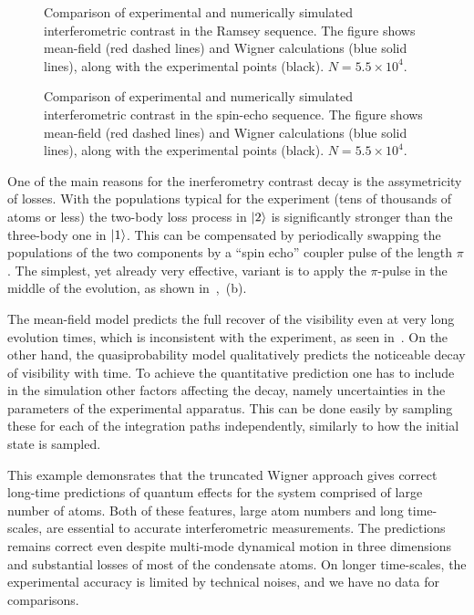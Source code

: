 \begin{figure}

    \caption{
    Comparison of experimental and numerically simulated interferometric contrast in the Ramsey sequence.
    The figure shows mean-field (red dashed lines) and Wigner calculations (blue solid lines), along with the experimental points (black).
    $N = 5.5 \times 10^4$.}

    \label{fig:bec-noise:phase-noise:ramsey-visibility}
\end{figure}

\begin{figure}

    \caption{
    Comparison of experimental and numerically simulated interferometric contrast in the spin-echo sequence.
    The figure shows mean-field (red dashed lines) and Wigner calculations (blue solid lines), along with the experimental points (black).
    $N = 5.5 \times 10^4$.}

    \label{fig:bec-noise:phase-noise:spin-echo-visibility}
\end{figure}

One of the main reasons for the inerferometry contrast decay is the assymetricity of losses.
With the populations typical for the experiment (tens of thousands of atoms or less) the two-body loss process in $\mbox{\ensuremath{\vert 2 \rangle}}$ is significantly stronger than the three-body one in $\mbox{\ensuremath{\vert 1 \rangle}}$.
This can be compensated by periodically swapping the populations of the two components by a ``spin echo'' coupler pulse of the length $\pi$.
The simplest, yet already very effective, variant is to apply the $\pi$-pulse in the middle of the evolution, as shown in~,~(b).

The mean-field model predicts the full recover of the visibility even at very long evolution times, which is inconsistent with the experiment, as seen in~.
On the other hand, the quasiprobability model qualitatively predicts the noticeable decay of visibility with time.
To achieve the quantitative prediction one has to include in the simulation other factors affecting the decay, namely uncertainties in the parameters of the experimental apparatus.
This can be done easily by sampling these for each of the  integration paths independently, similarly to how the initial state is sampled.

This example demonsrates that the truncated Wigner approach gives correct long-time predictions of quantum effects for the system comprised of large number of atoms.
Both of these features, large atom numbers and long time-scales, are essential to accurate interferometric measurements.
The predictions remains correct even despite multi-mode dynamical motion in three dimensions and substantial losses of most of the condensate atoms.
On longer time-scales, the experimental accuracy is limited by technical noises, and we have no data for comparisons.
